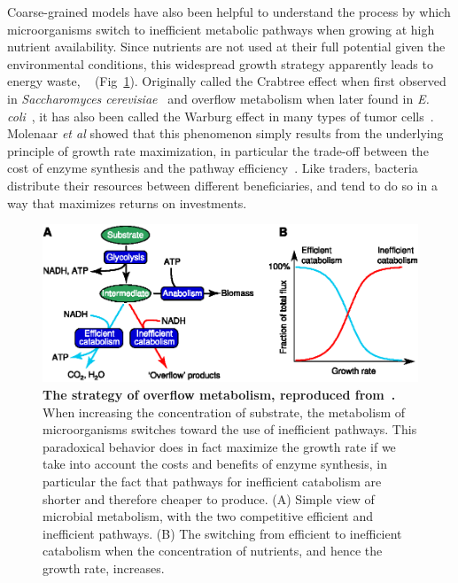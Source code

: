 Coarse-grained models have also been helpful to understand the process by which microorganisms switch to inefficient metabolic pathways when growing at high nutrient availability.
Since nutrients are not used at their full potential given the environmental conditions, this widespread growth strategy apparently leads to energy waste, ~\cite{molenaar_shifts_2009} (Fig~\ref{fig:molenaar_overflow}).
Originally called the Crabtree effect when first observed in \textit{Saccharomyces cerevisiae}~\cite{dijken_kinetics_1993} and overflow metabolism when later found in \textit{E. coli}~\cite{vemuri_overflow_2006}, it has also been called the Warburg effect in many types of tumor cells~\cite{mckeehan_glycolysis_1982,hsu_cancer_2008}.
Molenaar \textit{et al} showed that this phenomenon simply results from the underlying principle of growth rate maximization, in particular the trade-off between the cost of enzyme synthesis and the pathway efficiency~\cite{molenaar_shifts_2009}.
Like traders, bacteria distribute their resources between different beneficiaries, and tend to do so in a way that maximizes returns on investments.

\begin{figure}[tb]
\centering
\includegraphics[width=\textwidth]{./Fig/Chapter1/molenaar_overflow.eps}
\caption{
\textbf{The strategy of overflow metabolism, reproduced from~\cite{molenaar_shifts_2009}.}
When increasing the concentration of substrate, the metabolism of microorganisms switches toward the use of inefficient pathways.
This paradoxical behavior does in fact maximize the growth rate if we take into account the costs and benefits of enzyme synthesis, in particular the fact that pathways for inefficient catabolism are shorter and therefore cheaper to produce.
(A) Simple view of microbial metabolism, with the two competitive efficient and inefficient pathways.
(B) The switching from efficient to inefficient catabolism when the concentration of nutrients, and hence the growth rate, increases.
}
\label{fig:molenaar_overflow}
\end{figure}

